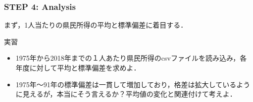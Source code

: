 
\subsubsection*{STEP 4: Analysis}
%
まず，1人当たりの県民所得の平均と標準偏差に着目する．
%

%
\begin{itembox}[l]{実習}
%
\begin{itemize}
\item
1975年から2018年までの１人あたり県民所得のcsvファイルを読み込み，各年度に対して平均と標準偏差を求めよ．
\item
1975年〜91年の標準偏差は一貫して増加しており，格差は拡大しているように見えるが，本当にそう言えるか？平均値の変化と関連付けて考えよ．
\end{itemize}
%
\end{itembox}
%

